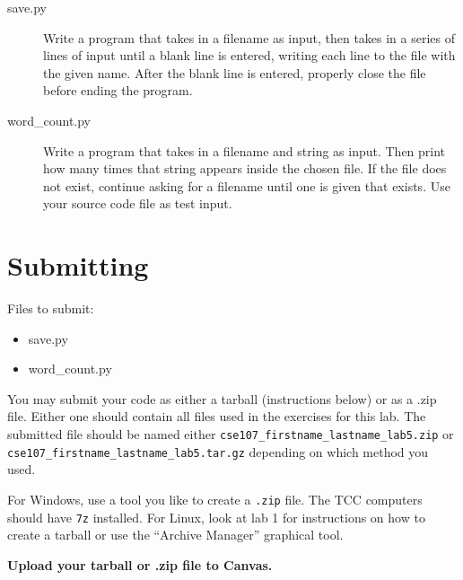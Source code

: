 \documentclass[11pt]{cselabheader}
\begin{document}
\begin{description}
  \item[save.py] Write a program that takes in a filename as input, then takes in a series of lines of input until a blank line is entered, writing each line to the file with the given name. After the blank line is entered, properly close the file before ending the program.
  \item[word\_count.py] Write a program that takes in a filename and string as input. Then print how many times that string appears inside the chosen file. If the file does not exist, continue asking for a filename until one is given that exists. Use your source code file as test input.
\end{description}

\section{Submitting}

Files to submit:
\begin{itemize}
  \item save.py
  \item word\_count.py
\end{itemize}

You may submit your code as either a tarball (instructions below) or as a .zip
file. Either one should contain all files used in the exercises for this lab.
The submitted file should be named either
\texttt{cse107\_firstname\_lastname\_lab5.zip} or
\texttt{cse107\_firstname\_lastname\_lab5.tar.gz} depending on which method you
used.

For Windows, use a tool you like to create a \texttt{.zip} file. The TCC
computers should have \texttt{7z} installed. For Linux, look at lab 1 for
instructions on how to create a tarball or use the ``Archive Manager'' graphical
tool.

\begin{center}
  \textbf{Upload your tarball or .zip file to Canvas.}
\end{center}
\end{document}
